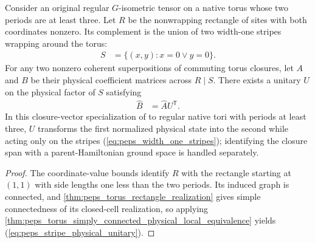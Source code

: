 \begin{lemma}%
    \label{thm:peps_torus_stripe_local_equivalence}
    \leanok
    Consider an original regular $G$-isometric tensor on a native
    torus whose two periods are at least three. Let $R$ be the
    nonwrapping rectangle of sites with both coordinates nonzero.
    Its complement is the union of two width-one stripes wrapping
    around the torus:
    \begin{align}
        S & =\{(x,y):x=0\lor y=0\}.
        \label{eq:peps_width_one_stripes}
    \end{align}
    For any two nonzero coherent superpositions of commuting torus
    closures, let $A$ and $B$ be their physical coefficient matrices
    across $R\mid S$. There exists a unitary $U$ on the physical
    factor of $S$ satisfying
    \begin{align}
        \widehat B & =\widehat A U^{\mathsf T}.
        \label{eq:peps_stripe_physical_unitary}
    \end{align}
    In this closure-vector specialization of
    \cite[Theorem~6.7]{Schuch2010PEPS} to regular native tori with periods
    at least three, $U$ transforms the first normalized physical state into
    the second while acting only on the stripes
    (\ref{eq:peps_width_one_stripes}); identifying the closure span with a
    parent-Hamiltonian ground space is handled separately.
\end{lemma}

\begin{proof}\leanok
    The coordinate-value bounds identify $R$ with the rectangle
    starting at $(1,1)$ with side lengths one less than the two periods.
    Its induced graph is connected, and
    \ref{thm:peps_torus_rectangle_realization} gives simple
    connectedness of its closed-cell realization, so applying
    \ref{thm:peps_torus_simply_connected_physical_local_equivalence}
    yields (\ref{eq:peps_stripe_physical_unitary}).
\end{proof}
